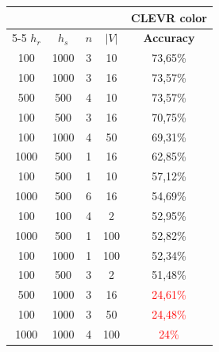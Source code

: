 \begin{table}[ht]
    \centering
    \begin{tabular}{cccc|c}
        \toprule
                                      &           &     &       & \multicolumn{1}{c}{\textbf{CLEVR color}} \\  \cmidrule(lr){5-5}
        $h_r$                         & $h_s$     & $n$ & $|V|$ & \textbf{Accuracy}                        \\\midrule
        {100}                         & {1000}    & {3} & {10}  & {73,65\%}                                \\
        {100}                         & {1000}    & {3} & {16}  & {73,57\%}                                \\
        {500}                         & {500}     & {4} & {10}  & {73,57\%}                                \\
        {100}                         & {500}     & {3} & {16}  & {70,75\%}                                \\
        {100}                         & {1000}    & {4} & {50}  & {69,31\%}                                \\
        {1000}                        & {500}     & {1} & {16}  & {62,85\%}                                \\
        {100}                         & {500}     & {1} & {10}  & {57,12\%}                                \\
        {1000}                        & {500}     & {6} & {16}  & {54,69\%}                                \\
        {100}                         & {100}     & {4} & {2}   & {52,95\%}                                \\
        {1000}                        & {500}     & {1} & {100} & {52,82\%}                                \\
        {100}                         & {1000}    & {1} & {100} & {52,34\%}                                \\
        {100}                         & {500}     & {3} & {2}   & {51,48\%}                                \\
        {500}                         & {1000}    & {3} & {16}  & \textcolor{red}{24,61\%}                 \\
        {100}                         & {1000}    & {3} & {50}  & \textcolor{red}{24,48\%}                 \\
        {1000}                        & {1000}    & {4} & {100} & \textcolor{red}{24\%}                    \\

\end{tabular}
\end{table}
